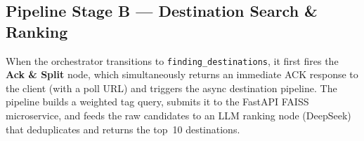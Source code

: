 \documentclass[12pt,a4paper]{report}
\begin{document}
\subsection{Pipeline Stage B --- Destination Search \& Ranking}
 
When the orchestrator transitions to \texttt{finding\_destinations}, it first fires the
\textbf{Ack \& Split} node, which simultaneously returns an immediate ACK response to the client
(with a poll URL) and triggers the async destination pipeline. The pipeline builds a weighted tag
query, submits it to the FastAPI FAISS microservice, and feeds the raw candidates to an LLM
ranking node (DeepSeek) that deduplicates and returns the top~10 destinations.
 
\end{document}
